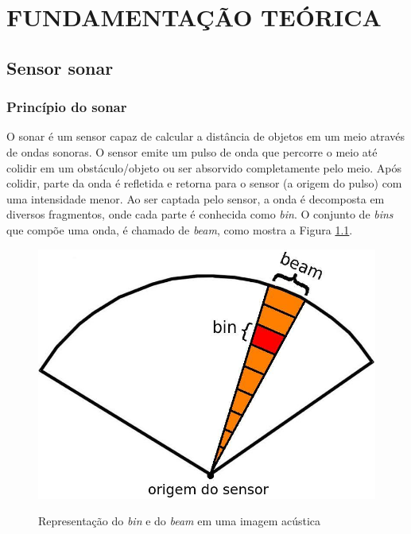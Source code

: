 \chapter{FUNDAMENTAÇÃO TEÓRICA}
\label{chap:fundamentacaoTeorica}


\section{Sensor sonar}
\label{sec:sonar}

\subsection{Princípio do sonar}
\label{sec:principio-sonar}

O sonar é um sensor capaz de calcular a distância de objetos em um meio através de ondas sonoras. 
O sensor emite um pulso de onda que percorre o meio até colidir em um obstáculo/objeto ou ser absorvido completamente pelo meio. 
Após colidir, parte da onda é refletida e retorna para o sensor (a origem do pulso) com uma intensidade menor. 
Ao ser captada pelo sensor, a onda é decomposta em diversos fragmentos, onde cada parte é conhecida como \textit{bin}. O conjunto de \textit{bins} que compõe uma onda, é chamado de \textit{beam}, como mostra a Figura \ref{fig:imagem_acustica}.

\begin{figure}[H]
    \centering
    \caption{Representação do \textit{bin} e do \textit{beam} em uma imagem acústica}
    \includegraphics[scale=0.4]{dados/figuras/imagem_acustica.jpg}
    \label{fig:imagem_acustica}
\end{figure}

